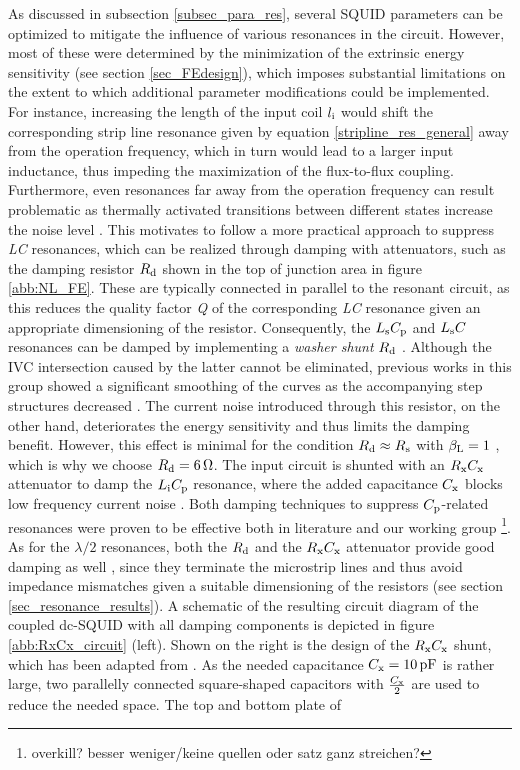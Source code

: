 As discussed in subsection \ref{subsec_para_res}, several SQUID parameters can be optimized to mitigate the influence of various resonances in the circuit. However, most of these were determined by the minimization of the extrinsic energy sensitivity (see section \ref{sec_FEdesign}), which imposes substantial limitations on the extent to which additional parameter modifications could be implemented. For instance, increasing the length of the input coil $l_{\rm i}$ would shift the corresponding strip line resonance given by equation \ref{stripline_res_general} away from the operation frequency, which in turn would lead to a larger input inductance, thus impeding the maximization of the flux-to-flux coupling. Furthermore, even resonances far away from the operation frequency can result problematic as thermally activated transitions between different states increase the noise level \cite{Sepp1987}. This motivates to follow a more practical approach to suppress \textit{LC} resonances, which can be realized through damping with attenuators, such as the damping resistor $R_{\rm d}$ shown in the top of junction area in figure \ref{abb:NL_FE}. These are typically connected in parallel to the resonant circuit, as this reduces the quality factor \textit{Q} of the corresponding \textit{LC} resonance given an appropriate dimensioning of the resistor. Consequently, the $L_{\rm s}C_{\rm p}$ and $L_{\rm s}C$ resonances can be damped by implementing a \textit{washer shunt} $R_{\rm d}$ \cite{Ono1997, Ryh1992}. Although the IVC intersection caused by the latter cannot be eliminated, previous works in this group showed a significant smoothing of the curves as the accompanying step structures decreased \cite{Bauer2018}. The current noise introduced through this resistor, on the other hand, deteriorates the energy sensitivity and thus limits the damping benefit. However, this effect is minimal for the condition $R_{\rm d}\approx R_{\rm s}$ with $\beta_{\rm L}=1$ \cite{Enpuku1986, Ryh1992}, which is why we choose $R_{\rm d}=\qty{6}{\ohm}$. The input circuit is shunted with an $R_{\rm x}C_{\rm x}$ attenuator to damp the $L_{\rm i}C_{\rm p}$ resonance, where the added capacitance $C_{\rm x}$ blocks low frequency current noise \cite{Sepp1987}. Both damping techniques to suppress $C_{\rm p}$-related resonances were proven to be effective both in literature and our working group \cite{Sepp1987,Knuutila1987, Enpuku1986,Can1991,Bauer2018,Bauer2022}\footnote{overkill? besser weniger/keine quellen oder satz ganz streichen?}. As for the $\lambda/2$ resonances, both the $R_{\rm d}$ and the $R_{\rm x}C_{\rm x}$ attenuator provide good damping as well \cite{Can1991}, since they terminate the microstrip lines and thus avoid impedance mismatches given a suitable dimensioning of the resistors (see section \ref{sec_resonance_results}). A schematic of the resulting circuit diagram of the coupled dc-SQUID with all damping components is depicted in figure \ref{abb:RxCx_circuit} (left). Shown on the right is the design of the $R_{\rm x}C_{\rm x}$ shunt, which has been adapted from \cite{Bauer2022}. As the needed capacitance $C_{\rm x}=\qty{10}{\pico\farad}$ is rather large, two parallelly connected square-shaped capacitors with $\frac{C_{\rm x}}{2}$ are used to reduce the needed space. The top and bottom plate of 
